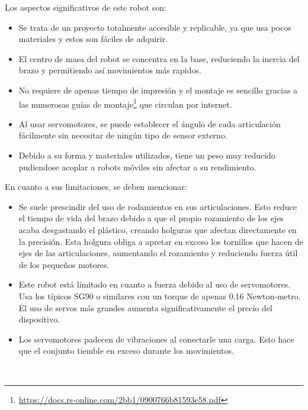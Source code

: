 \begin{itemize}
    Los aspectos significativos de este robot son:
    \begin{itemize}
        \item Se trata de un proyecto totalmente accesible y replicable, ya que usa pocos materiales y estos son fáciles de adquirir.
        \item El centro de masa del robot se concentra en la base, reduciendo la inercia del brazo y permitiendo así movimientos más rapidos.
        \item No requiere de apenas tiempo de impresión y el montaje es sencillo gracias a las numerosas guías de 
        montaje\footnote{\url{https://docs.rs-online.com/2bb1/0900766b81593e58.pdf}} que circulan por internet.
        \item Al usar servomotores, se puede establecer el ángulo de cada articulación fácilmente sin necesitar de ningún tipo de sensor externo.
        \item Debido a su forma y materiales utilizados, tiene un peso muy reducido pudiendose acoplar a robots móviles sin afectar a 
        su rendimiento.
    \end{itemize}
    En cuanto a sus limitaciones, se deben mencionar:
    \begin{itemize}
    \item Se suele prescindir del uso de rodamientos en sus articulaciones. Esto reduce el tiempo de vida del brazo debido a que el propio rozamiento 
    de los ejes acaba desgastando el plástico, creando holguras que afectan directamente en la precisión. Esta holgura obliga a apretar en exceso los tornillos 
    que hacen de ejes de las articulaciones, aumentando el rozamiento y reduciendo fuerza útil de los pequeños motores.
    \item Este robot está limitado en cuanto a fuerza debido al uso de servomotores. Usa los típicos SG90 o similares con un torque de apenas 
    0.16 Newton-metro. El uso de servos más grandes aumenta significativamente el precio del dispositivo. 
    \item Los servomotores padecen de vibraciones al conectarle una carga. Esto hace que el conjunto tiemble en exceso durante los movimientos.
    \end{itemize}
\end{itemize}\
\vspace{1cm}
